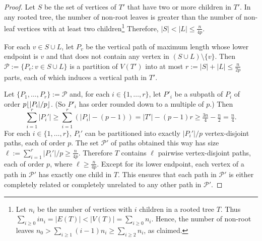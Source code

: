 \documentclass{patmorin}
\DeclarePairedDelimiter{\floor}{\lfloor}{\rfloor}
\renewcommand{\ge}{\geqslant}
\renewcommand{\le}{\leqslant}
\renewcommand{\geq}{\geqslant}
\theoremstyle{plain}
\theoremstyle{definition}
\begin{document}
\begin{proof}
  Let $S$ be the set of vertices of $T'$ that have two or more children in $T'$.  In any rooted tree, the number of non-root leaves is greater than the number of non-leaf vertices with at least two children\footnote{Let $n_i$ be the number of vertices with $i$ children in a rooted tree $T$. Thus $\sum_{i\geq 0} i n_i=|E(T)|<|V(T)|=\sum_{i\geq 0}n_i$. Hence, the number of non-root leaves 
  $n_0 > \sum_{i\geq 1} (i-1) n_i \geq \sum_{i\geq 2} n_i$, as claimed.}  Therefore, $|S|<|L|\le \tfrac{n}{4p}$.

  For each $v\in S\cup L$, let $P_v$ be the vertical path of maximum length whose lower endpoint is $v$ and that does not contain any vertex in $(S\cup L)\setminus \{v\}$.  Then $\mathcal{P}:=\{P_v:v\in S\cup L\}$ is a partition of $V(T')$ into at most $r:=|S|+|L|\le \tfrac{n}{2p}$ parts, each of which induces a vertical path in $T'$.

  Let $\{P_1,\ldots,P_r\}:=\mathcal{P}$ and, for each $i\in\{1,\ldots,r\}$, let $P'_i$ be a subpath of $P_i$ of order $p\floor{|P_i|/p}$. (So $P'_i$ has order rounded down to a multiple of $p$.)  Then 
  $$\sum_{i=1}^r |P_i'|\ge \sum_{i=1}^r (|P_i|-(p-1)) = |T'| - (p-1)r\ge \tfrac{3n}{4}-\tfrac{n}{2}=\tfrac{n}{4}.$$ 
  For each $i\in\{1,\ldots,r\}$, $P_i'$ can be partitioned into exactly $|P_i'|/p$ vertex-disjoint paths, each of order $p$.  The set $\mathcal{P}'$ of paths obtained this way has size $\ell := \sum_{i=1}^r |P_i'|/p \ge \tfrac{n}{4p}$.  Therefore $T$ contains $\ell$ pairwise vertex-disjoint paths, each of order $p$, where $\ell\ge \tfrac{n}{4p}$.  Except for its lower endpoint, each vertex of a path in $\mathcal{P}'$ has exactly one child in $T$.  This ensures that each path in $\mathcal{P}'$ is either completely related or completely unrelated to any other path in $\mathcal{P}'$.
\end{proof}
\end{document}
